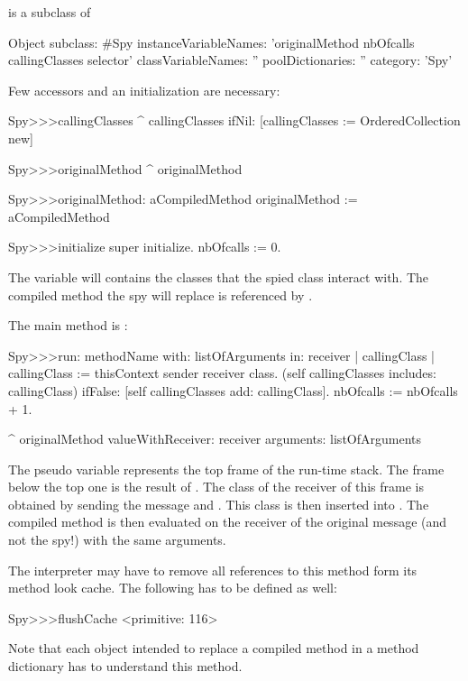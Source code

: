 \documentclass[a4paper,10pt,twoside]{book}
\begin{document}
 is a subclass of 
\begin{code}{}
Object subclass: #Spy
	instanceVariableNames: 'originalMethod nbOfcalls callingClasses selector'
	classVariableNames: ''
	poolDictionaries: ''
	category: 'Spy'
\end{code}

Few accessors and an initialization are necessary:
\begin{code}{}
Spy>>>callingClasses
	^ callingClasses ifNil: [callingClasses := OrderedCollection new]

Spy>>>originalMethod
	^ originalMethod

Spy>>>originalMethod: aCompiledMethod
	originalMethod := aCompiledMethod 

Spy>>>initialize
	super initialize.
	nbOfcalls := 0.
\end{code}

The variable  will contains the classes that the spied class interact with. The compiled method the spy will replace is referenced by .

The main method is :
\begin{code}{}
Spy>>>run: methodName with: listOfArguments in: receiver
	| callingClass |
	callingClass := thisContext sender receiver class.
	(self callingClasses includes: callingClass)
		ifFalse: [self callingClasses add: callingClass].
	nbOfcalls := nbOfcalls + 1.
		
	^ originalMethod valueWithReceiver: receiver arguments: listOfArguments 
\end{code}

The pseudo variable  represents the top frame of the run-time stack. The frame below the top one is the result of . The class of the receiver of this frame is obtained by sending the message  and . This class is then inserted into . The compiled method is then evaluated on the receiver of the original message (and not the spy!) with the same arguments.

The \pharo interpreter may have to remove all references to this method form its method look cache. The following has to be defined as well:

\begin{code}{}
Spy>>>flushCache
	<primitive: 116>
\end{code}

Note that each object intended to replace a compiled method in a method dictionary has to understand this method.
\end{document}
